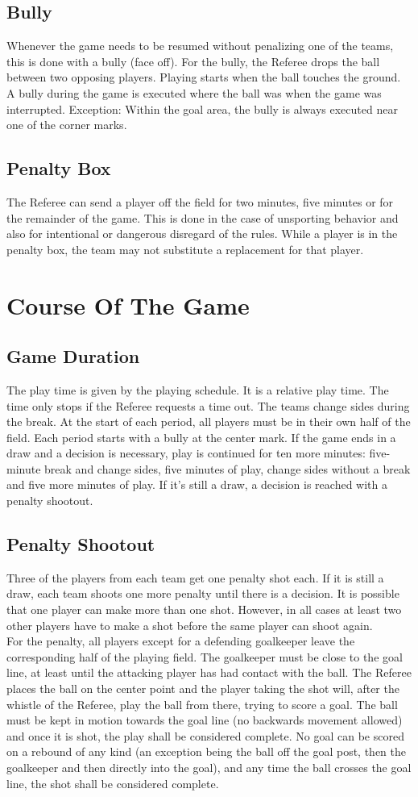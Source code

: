 \subsection{Bully}
Whenever the game needs to be resumed without penalizing one of the teams, this is done with a bully (face off). For
the bully, the Referee drops the ball between two opposing players. Playing starts when the ball touches the ground. A
bully during the game is executed where the ball was when the game was interrupted. Exception: Within the goal area,
the bully is always executed near one of the corner marks.
\subsection{Penalty Box}
The Referee can send a player off the field for two minutes, five minutes or for the remainder of the game. This is done
in the case of unsporting behavior and also for intentional or dangerous disregard of the rules. While a player is in the
penalty box, the team may not substitute a replacement for that player.
\section{Course Of The Game}
\subsection{Game Duration}
The play time is given by the playing schedule. It is a relative play time. The time only stops if the Referee requests a
time out. The teams change sides during the break. At the start of each period, all players must be in their own half of
the field. Each period starts with a bully at the center mark. If the game ends in a draw and a decision is necessary, play
is continued for ten more minutes: five-minute break and change sides, five minutes of play, change sides without a
break and five more minutes of play. If it’s still a draw, a decision is reached with a penalty shootout.
\subsection{Penalty Shootout}
Three of the players from each team get one penalty shot each. If it is still a draw, each team shoots one more penalty
until there is a decision. It is possible that one player can make more than one shot. However, in all cases at least two
other players have to make a shot before the same player can shoot again.\\
For the penalty, all players except for a defending goalkeeper leave the corresponding half of the playing field. The
goalkeeper must be close to the goal line, at least until the attacking player has had contact with the ball. The Referee
places the ball on the center point and the player taking the shot will, after the whistle of the Referee, play the ball from
there, trying to score a goal. The ball must be kept in motion towards the goal line (no backwards movement allowed)
and once it is shot, the play shall be considered complete. No goal can be scored on a rebound of any kind (an
exception being the ball off the goal post, then the goalkeeper and then directly into the goal), and any time the ball
crosses the goal line, the shot shall be considered complete.
